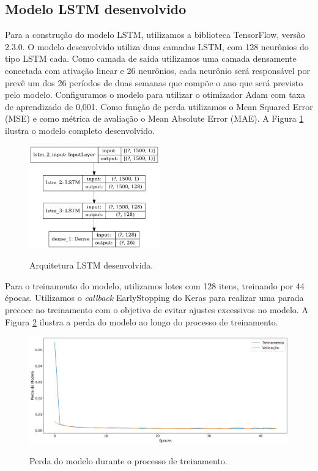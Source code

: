 \subsection{Modelo LSTM desenvolvido}

Para a construção do modelo LSTM, utilizamos a biblioteca TensorFlow, versão 2.3.0. O modelo desenvolvido utiliza duas camadas LSTM, com 128 neurônios do tipo LSTM cada. Como camada de saída utilizamos uma camada densamente conectada com  ativação linear e 26 neurônios, cada neurônio será responsável por prevê um dos 26 períodos de duas semanas que compõe o ano que será previsto pelo modelo. Configuramos o modelo para utilizar o otimizador Adam com taxa de aprendizado de 0,001. Como função de perda utilizamos o Mean Squared Error (MSE) e como métrica de avaliação o Mean Absolute Error (MAE). A Figura \ref{fig:modelo_lstm} ilustra o modelo completo desenvolvido. 

\begin{figure}[H]
\centering
\caption{Arquitetura LSTM desenvolvida.}
\includegraphics[width=0.5\textwidth]{figuras/lstm_model.png}
\label{fig:modelo_lstm}
\end{figure}

Para o treinamento do modelo, utilizamos lotes com 128 itens, treinando por 44 épocas. Utilizamos o \textit{callback} EarlyStopping do Keras para realizar uma parada precoce no treinamento com o objetivo de evitar ajustes excessivos no modelo. A Figura \ref{fig:perda_modelo} ilustra a perda do modelo ao longo do processo de treinamento. 

\begin{figure}[H]
\centering
\caption{Perda do modelo durante o processo de treinamento.}
\includegraphics[width=\textwidth]{figuras/grafico_de_perda.png}
\label{fig:perda_modelo}
\end{figure}

\renewcommand{\cleardoublepage}{}
\renewcommand{\clearpage}{}
\vspace{5mm}